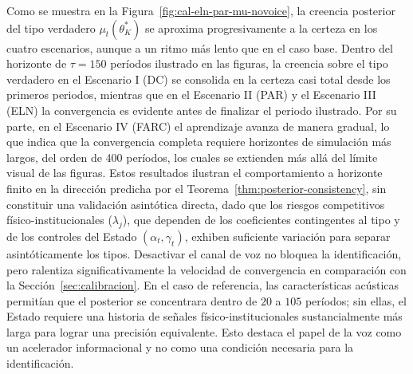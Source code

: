 \documentclass[review,authoryear,12pt]{elsarticle}
\theoremstyle{plain}
\theoremstyle{definition}
\newcommand{\1}{\mathbf{1}}
\begin{document}
Como se muestra en la Figura~\ref{fig:cal-eln-par-mu-novoice}, la creencia posterior del tipo verdadero $\mu_t(\theta_K^\ast)$ se aproxima progresivamente a la certeza en los cuatro escenarios, aunque a un ritmo más lento que en el caso base. Dentro del horizonte de $\tau = 150$ períodos ilustrado en las figuras, la creencia sobre el tipo verdadero en el Escenario I (DC) se consolida en la certeza casi total desde los primeros periodos, mientras que en el Escenario II (PAR) y el Escenario III (ELN) la convergencia es evidente antes de finalizar el periodo ilustrado. Por su parte, en el Escenario IV (FARC) el aprendizaje avanza de manera gradual, lo que indica que la convergencia completa requiere horizontes de simulación más largos, del orden de 400 períodos, los cuales se extienden más allá del límite visual de las figuras. Estos resultados ilustran el comportamiento a horizonte finito en la dirección predicha por el Teorema~\ref{thm:posterior-consistency}, sin constituir una validación asintótica directa, dado que los riesgos competitivos físico-institucionales ($\lambda_j$), que dependen de los coeficientes contingentes al tipo y de los controles del Estado $(\alpha_t, \gamma_t)$, exhiben suficiente variación para separar asintóticamente los tipos. Desactivar el canal de voz no bloquea la identificación, pero ralentiza significativamente la velocidad de convergencia en comparación con la Sección~\ref{sec:calibracion}. En el caso de referencia, las características acústicas permitían que el posterior se concentrara dentro de $20$ a $105$ períodos; sin ellas, el Estado requiere una historia de señales físico-institucionales sustancialmente más larga para lograr una precisión equivalente. Esto destaca el papel de la voz como un acelerador informacional y no como una condición necesaria para la identificación.
\end{document}
